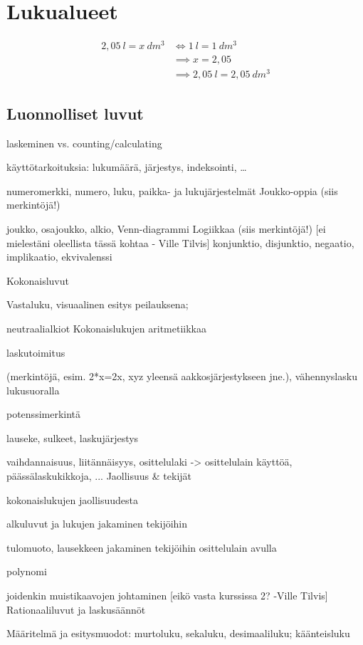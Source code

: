 


\part{Lukualueet}

\begin{align*}
2,05\ l = x\ dm^3  &\Leftrightarrow 1\ l = 1\ dm^3 \\
&\implies x = 2,05 \\
&\implies  2,05\ l = 2,05\ dm^3
\end{align*}

\chapter{Luonnolliset luvut}

laskeminen vs. counting/calculating

käyttötarkoituksia: lukumäärä, järjestys, indeksointi, …

numeromerkki, numero, luku, paikka- ja lukujärjestelmät
Joukko-oppia (siis merkintöjä!)

joukko, osajoukko, alkio, Venn-diagrammi
Logiikkaa (siis merkintöjä!) [ei mielestäni oleellista tässä kohtaa - Ville Tilvis]
konjunktio, disjunktio, negaatio, implikaatio, ekvivalenssi 

Kokonaisluvut

Vastaluku, visuaalinen esitys peilauksena; %

neutraalialkiot
Kokonaislukujen aritmetiikkaa

laskutoimitus

(merkintöjä, esim. 2*x=2x, xyz yleensä aakkosjärjestykseen jne.), vähennyslasku     lukusuoralla

potenssimerkintä

lauseke, sulkeet, laskujärjestys

vaihdannaisuus, liitännäisyys, osittelulaki -> osittelulain käyttöä, päässälaskukikkoja, ...
Jaollisuus \& tekijät

kokonaislukujen jaollisuudesta

alkuluvut ja lukujen jakaminen tekijöihin

tulomuoto, lausekkeen jakaminen tekijöihin osittelulain avulla

polynomi

joidenkin muistikaavojen johtaminen [eikö vasta kurssissa 2? -Ville Tilvis]
Rationaaliluvut ja laskusäännöt

Määritelmä ja esitysmuodot: murtoluku, sekaluku, desimaaliluku; käänteisluku

